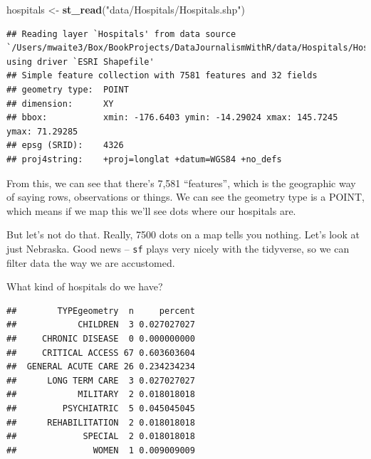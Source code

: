 \documentclass[]{book}
\newenvironment{Shaded}{\begin{snugshade}}{\end{snugshade}}
\newcommand{\KeywordTok}[1]{\textcolor[rgb]{0.13,0.29,0.53}{\textbf{#1}}}
\newcommand{\NormalTok}[1]{#1}
\newcommand{\OperatorTok}[1]{\textcolor[rgb]{0.81,0.36,0.00}{\textbf{#1}}}
\newcommand{\StringTok}[1]{\textcolor[rgb]{0.31,0.60,0.02}{#1}}
\begin{document}
\begin{Shaded}
\begin{Highlighting}[]
\NormalTok{hospitals <-}\StringTok{ }\KeywordTok{st_read}\NormalTok{(}\StringTok{"data/Hospitals/Hospitals.shp"}\NormalTok{)}
\end{Highlighting}
\end{Shaded}

\begin{verbatim}
## Reading layer `Hospitals' from data source `/Users/mwaite3/Box/BookProjects/DataJournalismWithR/data/Hospitals/Hospitals.shp' using driver `ESRI Shapefile'
## Simple feature collection with 7581 features and 32 fields
## geometry type:  POINT
## dimension:      XY
## bbox:           xmin: -176.6403 ymin: -14.29024 xmax: 145.7245 ymax: 71.29285
## epsg (SRID):    4326
## proj4string:    +proj=longlat +datum=WGS84 +no_defs
\end{verbatim}

From this, we can see that there's 7,581 ``features'', which is the geographic way of saying rows, observations or things. We can see the geometry type is a POINT, which means if we map this we'll see dots where our hospitals are.

But let's not do that. Really, 7500 dots on a map tells you nothing. Let's look at just Nebraska. Good news -- \texttt{sf} plays very nicely with the tidyverse, so we can filter data the way we are accustomed.

\begin{Shaded}
\end{Shaded}

What kind of hospitals do we have?

\begin{Shaded}
\end{Shaded}

\begin{verbatim}
##        TYPEgeometry  n     percent
##            CHILDREN  3 0.027027027
##     CHRONIC DISEASE  0 0.000000000
##     CRITICAL ACCESS 67 0.603603604
##  GENERAL ACUTE CARE 26 0.234234234
##      LONG TERM CARE  3 0.027027027
##            MILITARY  2 0.018018018
##         PSYCHIATRIC  5 0.045045045
##      REHABILITATION  2 0.018018018
##             SPECIAL  2 0.018018018
##               WOMEN  1 0.009009009
\end{verbatim}
\end{document}
